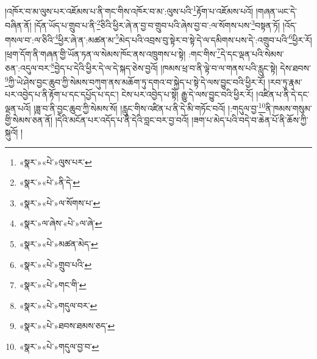 །འཁོར་བ་མ་ལུས་པར་འཇོམས་པ་ནི་གང་གིས་འཁོར་བ་མ་:ལུས་པའི་\footnote{«སྣར་»«པེ་»ལུས་པར་}རྟོག་པ་འཇོམས་པའོ། །གཞན་ཡང་དེ་བཞིན་ནོ། །དོན་ཡོད་པ་གྲུབ་པ་ནི་\footnote{«སྣར་»«པེ་»ནི་དེ་}ཅིའི་ཕྱིར་ཞེ་ན་བྱ་བ་གྲུབ་པའི་ཞེས་བྱ་བ་:ལ་སོགས་པས་\footnote{«སྣར་»«པེ་»ལ་སོགས་པ་}བསྟན་ཏོ། །འོད་གསལ་བ་:ལ་ཅིའི་\footnote{«སྣར་»ལ་ཞེས་«པེ་»ལ་ཞེ་}ཕྱིར་ཞེ་ན་:མཚན་མ་\footnote{«སྣར་»«པེ་»མཚན་མེད་}མེད་པའི་འབྲས་བུ་སྟེར་བ་སྟེ་དེ་ལ་དམིགས་པས་དེ་:འགྲུབ་པའི་\footnote{«སྣར་»«པེ་»གྲུབ་པའི་}ཕྱིར་རོ། །ཕྲག་དོག་ནི་གཞན་གྱི་ཡོན་ཏན་ལ་སེམས་ཁོང་ནས་འཁྲུགས་པ་སྟེ། :གང་གིས་\footnote{«སྣར་»«པེ་»གང་གི་}དེ་དང་ལྡན་པའི་སེམས་ཅན་:འདུལ་བར་\footnote{«སྣར་»«པེ་»གདུལ་བར་}བྱེད་པ་དེའི་ཕྱིར་དེ་ལ་དེ་སྐད་ཅེས་བྱའོ། །ཁམས་ཕྲ་བ་ནི་ལྟེ་བ་ལ་གནས་པའི་རླུང་སྟེ། དེས་ཐབས་\footnote{«སྣར་»«པེ་»ཐབས་ཐམས་ཅད་}ཀྱི་ཡེ་ཤེས་བྱང་ཆུབ་ཀྱི་སེམས་བཀུག་ནས་མཆོག་ཏུ་དགའ་བ་སྐྱེད་པ་སྟེ་དེ་ལས་བྱུང་བའི་ཕྱིར་རོ། །རབ་ཏུ་རྣམ་པར་འབྱེད་པ་ནི་རྟོག་པ་དང་དཔྱོད་པ་དང་། ངེས་པར་འབྱེད་པ་སྟེ། རྒྱུ་དེ་ལས་བྱུང་བའི་ཕྱིར་རོ། །འཛིན་པ་ནི་དེ་དང་ལྡན་པའོ། །ཟླ་བ་ནི་བྱང་ཆུབ་ཀྱི་སེམས་སོ། །རླུང་གིས་འཛིན་པ་ནི་དེ་མི་གཏོང་བའོ། །:གདུལ་བྱ་\footnote{«སྣར་»«པེ་»གདུལ་བྱ་བ་}ནི་ཁམས་གསུམ་གྱི་སེམས་ཅན་ནོ། །དེའི་མངོན་པར་འདོད་པ་ནི་དེའི་བླང་བར་བྱ་བའོ། །ཟག་པ་མེད་པའི་བདེ་བ་ཆེན་པོ་ནི་ཆོས་ཀྱི་སྐུའོ། །

